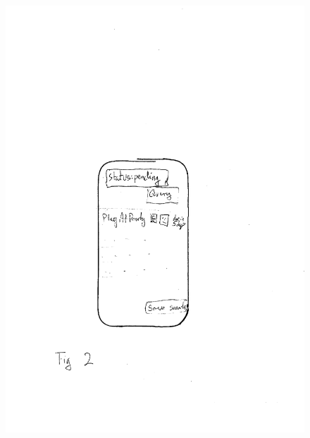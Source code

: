 \documentclass[envcountsame]{llncs}
\begin{document}
\begin{figure}[bth]
{    {\includegraphics[scale=0.80]{gfx/searchresult}}}
      \label{fig:first4}\caption{}
\end{figure}
\end{document}
